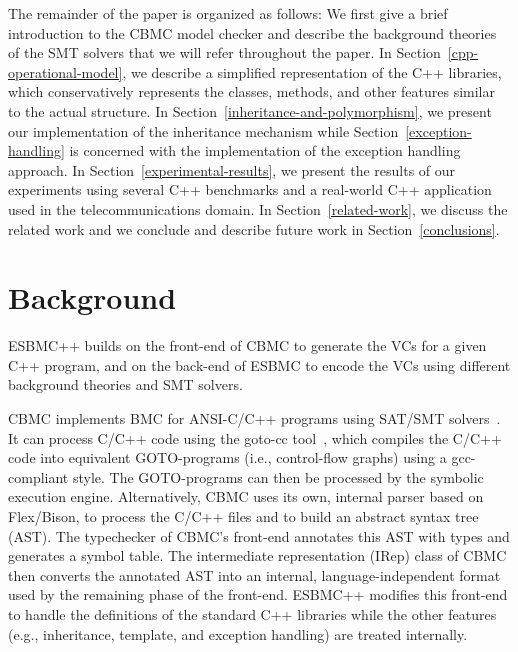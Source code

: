 \documentclass[conference]{IEEEtran}
\begin{document}
The remainder of the paper is organized as follows: We first give a brief
introduction to the CBMC model checker and describe the background
theories of the SMT solvers that we will refer throughout the paper.
In Section~\ref{cpp-operational-model}, we describe a simplified representation of the C++
libraries, which conservatively represents the classes, methods, and other features
similar to the actual structure. In Section~\ref{inheritance-and-polymorphism}, we present
our implementation of the inheritance mechanism while Section~\ref{exception-handling}
is concerned with the implementation of the exception handling approach.
In Section~\ref{experimental-results}, we present the results of our experiments using
several C++ benchmarks and a real-world C++ application used in the telecommunications domain.
In Section~\ref{related-work}, we discuss the related work and we conclude and describe
future work in Section~\ref{conclusions}.

\section{Background}

ESBMC++ builds on the front-end of CBMC to generate the VCs for a given C++ program,
and on the back-end of ESBMC to encode the VCs using different background theories
and SMT solvers.

\smallskip{}
\label{sec:C-Bounded-Model-Checker}
%
CBMC implements BMC for ANSI-C/C++ programs using SAT/SMT
solvers~\cite{Clarke04}.  It can process C/C++ code using the goto-cc
tool~\cite{Wintersteiger09}, which compiles the C/C++ code into
equivalent GOTO-programs (i.e., control-flow graphs) using a
gcc-compliant style. The GOTO-programs can then be processed by the
symbolic execution engine. Alternatively, CBMC uses its own, internal
parser based on Flex/Bison, to process the C/C++ files and to build an
abstract syntax tree (AST). The typechecker of CBMC's front-end
annotates this AST with types and generates a symbol table. The intermediate
representation (IRep) class of CBMC then converts the annotated AST into an internal,
language-independent format used by the remaining phase of the
front-end.  ESBMC++ modifies this front-end to handle the definitions of
the standard C++ libraries while the other features (e.g., inheritance,
template, and exception handling) are treated internally.
\end{document}
